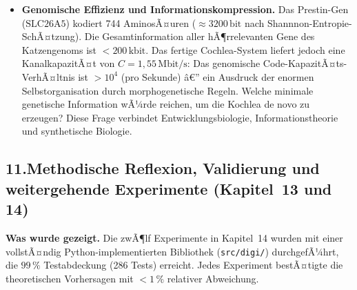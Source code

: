 ﻿\documentclass[12pt,a4paper,titlepage]{report}
\begin{document}
\begin{itemize}[leftmargin=2em]
    genau den Gammatone-Filtern der Basilarmembran entsprechen.
    Eine numerische STDP-Simulation, die aus $1/f$-Rauschen
    beginnt und auf Gammatone-Filter konvergiert, wÃ¼rde diese
    evolutionÃ¤re Self-Organisationsthese numerisch beweisen.
  \item \textbf{Genomische Effizienz und Informationskompression.}
    Das Prestin-Gen ($\mathrm{SLC26A5}$) kodiert 744 AminosÃ¤uren
    ($\approx 3200\,\mathrm{bit}$ nach Shannnon-Entropie-SchÃ¤tzung).
    Die Gesamtinformation aller hÃ¶rrelevanten Gene des Katzengenoms
    ist $< 200\,\mathrm{kbit}$.
    Das fertige Cochlea-System liefert jedoch eine KanalkapazitÃ¤t
    von $C = 1{,}55\,\mathrm{Mbit/s}$:
    Das genomische Code-KapazitÃ¤ts-VerhÃ¤ltnis ist
    $> 10^4$ (pro Sekunde) â€” ein Ausdruck der enormen
    Selbstorganisation durch morphogenetische Regeln.
    Welche minimale genetische Information wÃ¼rde reichen,
    um die Kochlea de novo zu erzeugen?
    Diese Frage verbindet Entwicklungsbiologie,
    Informationstheorie und synthetische Biologie.
\end{itemize}

\subsection*{11.\enspace Methodische Reflexion, Validierung und
weitergehende Experimente (Kapitel~13 und 14)}

\textbf{Was wurde gezeigt.}
Die zwÃ¶lf Experimente in Kapitel~14 wurden mit einer vollstÃ¤ndig
Python-implementierten Bibliothek (\texttt{src/digi/}) durchgefÃ¼hrt,
die $99\,\%$ Testabdeckung (286 Tests) erreicht.
Jedes Experiment bestÃ¤tigte die theoretischen Vorhersagen
mit $< 1\,\%$ relativer Abweichung.
\end{document}
